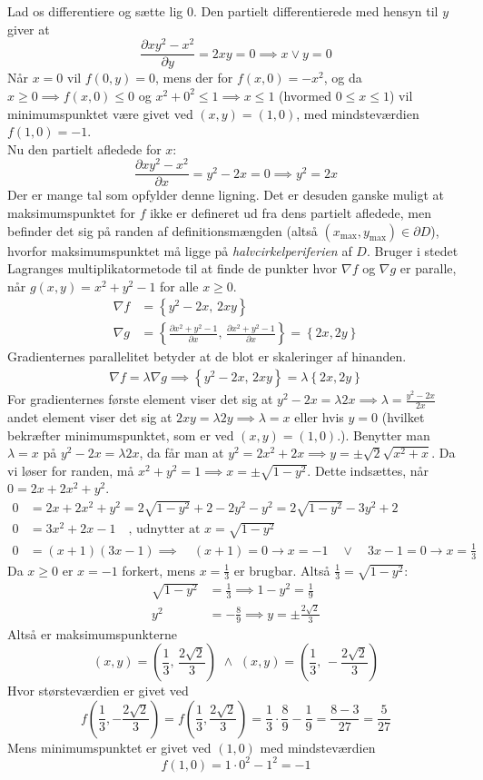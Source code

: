 \documentclass{report}
\begin{document}
Lad os differentiere og sætte lig $0$. Den partielt differentierede med hensyn til $y$ giver at
$$\frac{\partial xy^2-x^2}{\partial y}=2xy=0\implies x\lor y=0$$Når $x=0$ vil $f(0,y)=0$, mens der for $f(x,0)=-x^2$, og da $x\geq0\implies f(x,0)\leq0$ og $x^2+0^2\leq1\implies x\leq1$ (hvormed $0\leq x\leq 1$) vil minimumspunktet være givet ved $(x,y)=(1,0)$, med mindsteværdien $f(1,0)=-1$.\\
Nu den partielt afledede for $x$:
$$\frac{\partial xy^2-x^2}{\partial x}=y^2-2x=0\implies y^2=2x$$
Der er mange tal som opfylder denne ligning. Det er desuden ganske muligt at maksimumspunktet for $f$ ikke er defineret ud fra dens partielt afledede, men befinder det sig på randen af definitionsmængden (altså $(x_\text{max},y_\text{max})\in \partial D$), hvorfor maksimumspunktet må ligge på \textit{halvcirkelperiferien} af $D$. Bruger i stedet Lagranges multiplikatormetode til at finde de punkter hvor $\nabla f$ og $\nabla g$ er paralle, når $g(x,y)=x^2+y^2-1$ for alle $x\geq0$.
\begin{align*}
    \nabla f&=\left\{y^2-2x,\,2xy\right\}\\
    \nabla g&=\left\{\frac{\partial x^2+y^2-1}{\partial x},\,\frac{\partial x^2+y^2-1}{\partial x}\right\}=\left\{2x,2y\right\}
\end{align*}
Gradienternes parallelitet betyder at de blot er skaleringer af hinanden.
\begin{align*}
    \nabla f=\lambda\nabla g\implies\left\{y^2-2x,\,2xy\right\}=\lambda\left\{2x,2y\right\}
\end{align*}
For gradienternes første element viser det sig at $y^2-2x=\lambda 2x\implies\lambda=\frac{y^2-2x}{2x}$ andet element viser det sig at $2xy=\lambda 2y\implies \lambda=x$ eller hvis $y=0$ (hvilket bekræfter minimumspunktet, som er ved $(x,y)=(1,0)$.). Benytter man $\lambda=x$ på $y^2-2x=\lambda 2x$, da får man at $y^2=2x^2+2x\implies y=\pm\sqrt{2}\sqrt{x^2+x}$. Da vi løser for randen, må $x^2+y^2=1\implies x=\pm\sqrt{1-y^2}$. Dette indsættes, når $0=2x+2x^2+y^2$. 
\begin{align*}
    0&=2x+2x^2+y^2=2\sqrt{1-y^2}+2-2y^2-y^2=2\sqrt{1-y^2}-3y^2+2\\
    0&=3x^2+2x-1\quad\text{, udnytter at }x=\sqrt{1-y^2}\\
    0&=(x+1)(3x-1)\implies\quad (x+1)=0\to x=-1 \quad\lor\quad 3x-1=0\to x=\frac{1}{3}
\end{align*}
Da $x\geq0$ er $x=-1$ forkert, mens $x=\frac{1}{3}$ er brugbar. Altså $\frac{1}{3}=\sqrt{1-y^2}$:
\begin{align*}
    \sqrt{1-y^2}&=\frac{1}{3}\implies1-y^2=\frac{1}{9}\\
    y^2&=-\frac{8}{9}\implies y=\pm\frac{2\sqrt{2}}{3}
\end{align*}
Altså er maksimumspunkterne $$(x,y)=\left(\frac{1}{3},\,\frac{2\sqrt{2}}{3}\right)\,\,\land\,\,(x,y)=\left(\frac{1}{3},\,-\frac{2\sqrt{2}}{3}\right)$$
Hvor størsteværdien er givet ved $$f\left(\frac{1}{3},-\frac{2\sqrt{2}}{3}\right)=f\left(\frac{1}{3},\frac{2\sqrt{2}}{3}\right)=\frac{1}{3}\cdot\frac{8}{9}-\frac{1}{9}=\frac{8-3}{27}=\frac{5}{27}$$
Mens minimumspunktet er givet ved $(1,0)$ med mindsteværdien$$f(1,0)=1\cdot0^2-1^2=-1$$
\end{document}
